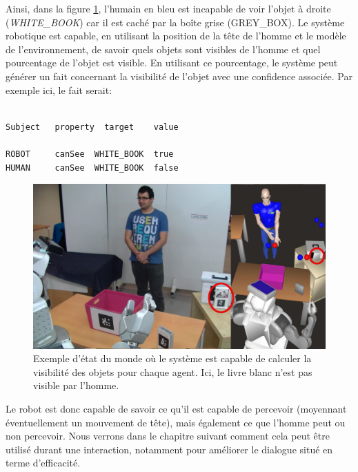 \documentclass[a4paper,11pt,twoside]{StyleThese}
\begin{document}
Ainsi, dans la figure \ref{fig:occludedHuman}, l'humain en bleu est incapable de voir l'objet à droite (\textit{WHITE\_BOOK}) car il est caché par la boîte grise (GREY\_BOX). Le système robotique est capable, en utilisant la position de la tête de l'homme et le modèle de l'environnement, de savoir quels objets sont visibles de l'homme et quel pourcentage de l'objet est visible.
En utilisant ce pourcentage, le système peut générer un fait concernant la visibilité de l'objet avec une confidence associée. Par exemple ici, le fait serait:

\begin{scriptsize}
\begin{verbatim}

Subject   property  target    value

ROBOT     canSee  WHITE_BOOK  true
HUMAN     canSee  WHITE_BOOK  false
\end{verbatim}
\end{scriptsize}

\begin{figure}[ht!]
 \centering
  \includegraphics[width=0.99\linewidth]{./img/blueMovedPr2M.png} 
  \caption {Exemple d'état du monde où le système est capable de calculer la visibilité des objets pour chaque agent. Ici, le livre blanc n'est pas visible par l'homme.}
  \label{fig:occludedHuman}
\end{figure}


Le robot est donc capable de savoir ce qu'il est capable de percevoir (moyennant éventuellement un mouvement de tête), mais également ce que l'homme peut ou non percevoir. Nous verrons dans le chapitre suivant comment cela peut être utilisé durant une interaction, notamment pour améliorer le dialogue situé en terme d'efficacité.
\end{document}
